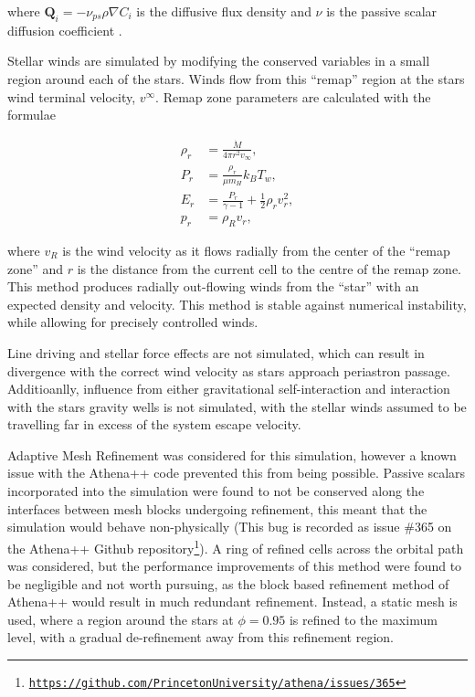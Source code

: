 where $\mathbf{Q}_i = - \nu_{ps} \rho \nabla C_i$ is the diffusive flux density and $\nu$ is the passive scalar diffusion coefficient \parencite{stoneAthenaAdaptiveMesh2020}.


Stellar winds are simulated by modifying the conserved variables in a small region around each of the stars.
Winds flow from this ``remap'' region at the stars wind terminal velocity, $v^\infty$. Remap zone parameters are calculated with the formulae

\begin{subequations}
  \begin{align}
    \rho_r & = \frac{\dot M}{4 \pi r^2 v_\infty} , \\
    P_r    & = \frac{\rho_r}{\mu m_H} k_B T_w , \\
    E_r    & = \frac{P_r}{\gamma - 1} + \frac{1}{2} \rho_{r} v_{r}^2 , \\
    p_{r}  & = \rho_R v_{r} , 
  \end{align}
\end{subequations}

\noindent
where $v_R$ is the wind velocity as it flows radially from the center of the ``remap zone'' and $r$ is the distance from the current cell to the centre of the remap zone.
This method produces radially out-flowing winds from the ``star'' with an expected density and velocity.
This method is stable against numerical instability, while allowing for precisely controlled winds.

Line driving and stellar force effects are not simulated, which can result in divergence with the correct wind velocity as stars approach periastron passage.
Additioanlly, influence from either gravitational self-interaction and interaction with the stars gravity wells is not simulated, with the stellar winds assumed to be travelling far in excess of the system escape velocity.

Adaptive Mesh Refinement was considered for this simulation, however a known issue with the Athena++ code prevented this from being possible.
Passive scalars incorporated into the simulation were found to not be conserved along the interfaces between mesh blocks undergoing refinement, this meant that the simulation would behave non-physically (This bug is recorded as issue \#365 on the Athena++ Github repository\footnote{\texttt{\href{https://github.com/PrincetonUniversity/athena/issues/365.}{https://github.com/PrincetonUniversity/athena/issues/365}}}).
A ring of refined cells across the orbital path was considered, but the performance improvements of this method were found to be negligible and not worth pursuing, as the block based refinement method of Athena++ would result in much redundant refinement.
Instead, a static mesh is used, where a region around the stars at $\phi = 0.95$ is refined to the maximum level, with a gradual de-refinement away from this refinement region.

